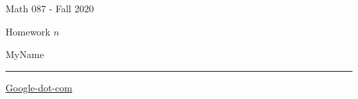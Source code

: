 \documentclass{article}
\begin{document}
\newcommand{\myname}{MyName}
\newcommand{\assignment}{Homework \(n\)}

\noindent
{\color{blue}
\begin{minipage}[t]{.35\textwidth}
  Math 087 - Fall 2020
\end{minipage}
\begin{minipage}[t]{.35\textwidth}
  \assignment
\end{minipage}
\begin{minipage}[t]{.30\textwidth}
  \myname 
\end{minipage}
\hrule
}

\vspace{2cm}
\href{http://www.google.com}{Google-dot-com}
\end{document}
